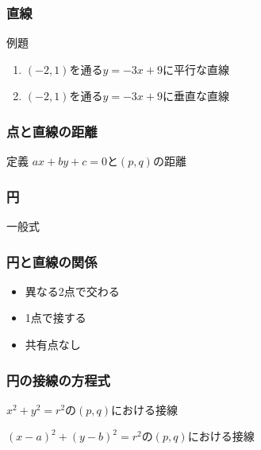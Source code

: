 \documentclass[10pt,dvipdfmx]{jsarticle}
\begin{document}
\subsubsection*{直線}
\begin{itembox}[l]{例題}
  \begin{large}
    \begin{enumerate}
      \item $(-2,1)$を通る$y=-3x+9$に平行な直線
      \item $(-2,1)$を通る$y=-3x+9$に垂直な直線
    \end{enumerate}
  \end{large}
\end{itembox}

\subsubsection*{点と直線の距離}
定義 $ax+by+c=0$と$(p,q)$の距離
\vspace{10mm}

\subsubsection*{円}
一般式
\vspace{10mm}

\subsubsection*{円と直線の関係}
\begin{multicols}{3}
  \begin{itemize}
    \item 異なる2点で交わる\vspace{8mm}
    \item 1点で接する\vspace{8mm}
    \item 共有点なし\vspace{8mm}
  \end{itemize}
\end{multicols}

\subsubsection*{円の接線の方程式}
$x^2+y^2=r^2$の$(p,q)$における接線
\vspace{10mm}

$(x-a)^2+(y-b)^2=r^2$の$(p,q)$における接線
\vspace{10mm}
\end{document}
